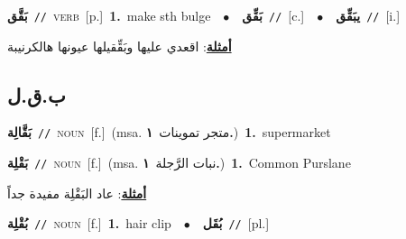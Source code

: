 \documentclass[10pt,a4paper,twoside]{article} %
\begin{document}
\begin{multicols}{2}
{\setlength\topsep{0pt}\textbf{\foreignlanguage{arabic}{بَقَّق}}\ {\color{gray}\texttt{//}\color{black}}\ \textsc{verb}\ [p.]\ \textbf{1.}~make sth bulge\ \ $\bullet$\ \ \setlength\topsep{0pt}\textbf{\foreignlanguage{arabic}{بَقِّق}}\ {\color{gray}\texttt{//}\color{black}}\ [c.]\ \ $\bullet$\ \ \setlength\topsep{0pt}\textbf{\foreignlanguage{arabic}{يبَقِّق}}\ {\color{gray}\texttt{//}\color{black}}\ [i.]\  \begin{flushright}\color{gray}\foreignlanguage{arabic}{\textbf{\underline{\foreignlanguage{arabic}{أمثلة}}}: اقعدي عليها وبَقِّقيلها عيونها هالكرنيبة}\end{flushright}\color{black}} \vspace{2mm}

\vspace{-3mm}
\subsection*{\color{blue}\foreignlanguage{arabic}{ب.ق.ل}\color{blue}{}} 

{\setlength\topsep{0pt}\textbf{\foreignlanguage{arabic}{بَقَّالِة}}\ {\color{gray}\texttt{//}\color{black}}\ \textsc{noun}\ [f.]\ \color{gray}(msa. \foreignlanguage{arabic}{متجر تموينات}~\foreignlanguage{arabic}{\textbf{١.}})\color{black}\ \textbf{1.}~supermarket\ } \vspace{2mm}

{\setlength\topsep{0pt}\textbf{\foreignlanguage{arabic}{بَقْلِة}}\ {\color{gray}\texttt{//}\color{black}}\ \textsc{noun}\ [f.]\ \color{gray}(msa. \foreignlanguage{arabic}{نبات الرَّجلة}~\foreignlanguage{arabic}{\textbf{١.}})\color{black}\ \textbf{1.}~Common Purslane\  \begin{flushright}\color{gray}\foreignlanguage{arabic}{\textbf{\underline{\foreignlanguage{arabic}{أمثلة}}}: عاد البَقْلِة مفيدة جداً}\end{flushright}\color{black}} \vspace{2mm}

{\setlength\topsep{0pt}\textbf{\foreignlanguage{arabic}{بُقْلِة}}\ {\color{gray}\texttt{//}\color{black}}\ \textsc{noun}\ [f.]\ \textbf{1.}~hair clip\ \ $\bullet$\ \ \setlength\topsep{0pt}\textbf{\foreignlanguage{arabic}{بُقَل}}\ {\color{gray}\texttt{//}\color{black}}\ [pl.]\ } \vspace{2mm}


\end{multicols}
\end{document}
